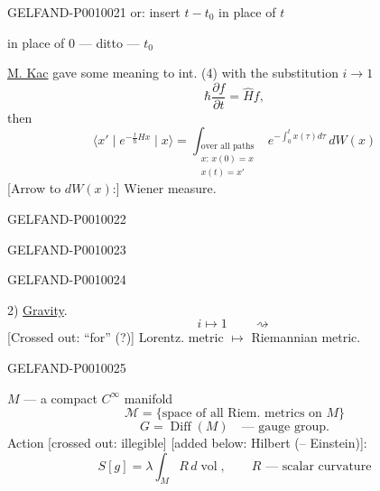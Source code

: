 \begin{GelfandAdjacentEvidence}{GELFAND-P001002}{1}
or: insert $t-t_0$ in place of $t$

\hspace{2em}in place of $0$ --- ditto --- $t_0$

\underline{M. Kac} gave some meaning to int. (4) with the substitution $i\to1$
\begin{equation*}
\hbar\frac{\partial f}{\partial t}=\widehat H f,
\tag{6}
\end{equation*}
then
\begin{equation*}
\langle x'\mid e^{-\frac{t}{\hbar}Hx}\mid x\rangle
=\int_{\substack{\text{over all paths}\\x:\,x(0)=x\\x(t)=x'}}
e^{-\int_0^t x(\tau)d\tau}\,dW(x)
\tag{7}
\end{equation*}
[Arrow to $dW(x)$:] Wiener measure.
\end{GelfandAdjacentEvidence}
\begin{GelfandAdjacentEvidence}{GELFAND-P001002}{2}

\end{GelfandAdjacentEvidence}
\begin{GelfandAdjacentEvidence}{GELFAND-P001002}{3}

\end{GelfandAdjacentEvidence}
\begin{GelfandAdjacentEvidence}{GELFAND-P001002}{4}


2) \underline{Gravity}.
\[
i\mapsto1\qquad\rightsquigarrow
\]
[Crossed out: “for” (?)] Lorentz. metric $\longmapsto$ Riemannian metric.
\end{GelfandAdjacentEvidence}
\begin{GelfandAdjacentEvidence}{GELFAND-P001002}{5}


$M$ --- a compact $C^\infty$ manifold
\[
\mathcal M=\{\text{space of all Riem. metrics on }M\}
\]
\[
G=\operatorname{Diff}(M)\quad\text{--- gauge group.}
\]
Action [crossed out: illegible] [added below: Hilbert (-- Einstein)]:
\begin{equation*}
S[g]=\lambda\int_M R\,d\operatorname{vol},\qquad
R\text{ --- scalar curvature}
\tag{8}
\end{equation*}
\end{GelfandAdjacentEvidence}
